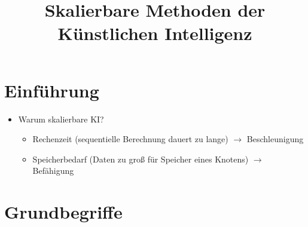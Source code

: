 \documentclass[11pt]{scrartcl}
\title{Skalierbare Methoden der Künstlichen Intelligenz}
\date{\vspace{-5ex}}
\begin{document}
\maketitle

\section{Einführung}

\begin{itemize}
    \item Warum skalierbare KI?
    \begin{itemize}
        \item Rechenzeit (sequentielle Berechnung dauert zu lange) $\rightarrow$ Beschleunigung
        \item Speicherbedarf (Daten zu groß für Speicher eines Knotens) $\rightarrow$ Befähigung    
    \end{itemize}
\end{itemize}

\section{Grundbegriffe}
\end{document}
